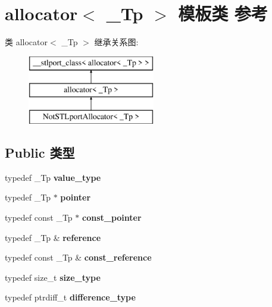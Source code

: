 \hypertarget{classallocator}{}\section{allocator$<$ \+\_\+\+Tp $>$ 模板类 参考}
\label{classallocator}
类 allocator$<$ \+\_\+\+Tp $>$ 继承关系图\+:\begin{figure}[H]
\begin{center}
\leavevmode
\includegraphics[height=3.000000cm]{classallocator}
\end{center}
\end{figure}
\subsection*{Public 类型}
\begin{DoxyCompactItemize}
\item 
\mbox{\label{classallocator_a2badd638d497e4c01900d4979d458213}} 
typedef \+\_\+\+Tp {\bfseries value\+\_\+type}
\item 
\mbox{\label{classallocator_aab1964003a74fbc5521a774155c2f698}} 
typedef \+\_\+\+Tp $\ast$ {\bfseries pointer}
\item 
\mbox{\label{classallocator_ad4e452b63f6d9acf986ac0876ee16180}} 
typedef const \+\_\+\+Tp $\ast$ {\bfseries const\+\_\+pointer}
\item 
\mbox{\label{classallocator_a4ad322119175ae6cfbc435f95bfa1d0f}} 
typedef \+\_\+\+Tp \& {\bfseries reference}
\item 
\mbox{\label{classallocator_a609e5d6b1dc84e32dbfed593a41b62f2}} 
typedef const \+\_\+\+Tp \& {\bfseries const\+\_\+reference}
\item 
\mbox{\label{classallocator_abbe9c7af09c3aaa0cf8b47698a046f20}} 
typedef size\+\_\+t {\bfseries size\+\_\+type}
\item 
\mbox{\label{classallocator_a5664b1ae7f0984e257c4847050144d2e}} 
typedef ptrdiff\+\_\+t {\bfseries difference\+\_\+type}
\end{DoxyCompactItemize}
